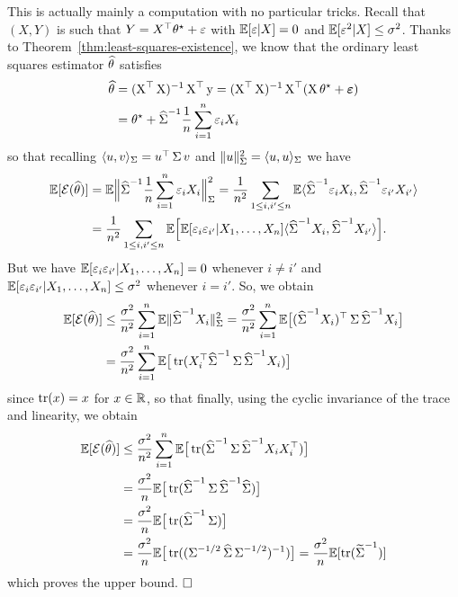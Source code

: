 This is actually mainly a computation with no particular tricks. 
Recall that $(X, Y)$ is such that $Y = X^\top \theta^\star + \eps$ with $\E[\eps | X] = 0$ and $\E[\eps^2 | X] \leq \sigma^2$.
Thanks to Theorem~\ref{thm:least-squares-existence}, we know that the ordinary least squares estimator $\wh \theta$ satisfies
\begin{align*}
	\wh \theta &= (\bX^\top \bX)^{-1} \bX^\top \by = (\bX^\top \bX)^{-1} \bX^\top (\bX \theta^\star + \beps) \\
		&= \theta^\star + \wh \bSigma^{-1} \frac{1}{n} \sum_{i=1}^n \eps_i X_i
\end{align*}
so that recalling $\inr{u, v}_{\bSigma} =u^\top \bSigma v$ and $\norm{u}_{\bSigma}^2 = \inr{u, u}_{\bSigma}$ we have
\begin{align*}
	\E [\cE(\wh \theta)] &= \E \Big\| \wh \bSigma^{-1} \frac{1}{n} \sum_{i=1}^n \eps_i X_i \Big \|_{\bSigma}^2
	 = \frac{1}{n^2} \sum_{1 \leq i, i' \leq n} \E \langle \wh \bSigma^{-1} \eps_i X_i, \wh \bSigma^{-1} \eps_{i'} X_{i'} \rangle \\
	 &= \frac{1}{n^2} \sum_{1 \leq i, i' \leq n} \E \Big[ \E [ \eps_i \eps_{i'} | X_1, \ldots, X_n] \langle \wh \bSigma^{-1}  X_i, \wh \bSigma^{-1} X_{i'} \rangle \Big].
\end{align*}
But we have $\E [ \eps_i \eps_{i'} | X_1, \ldots, X_n] = 0$ whenever $i \neq i'$ and $\E [ \eps_i \eps_{i'} | X_1, \ldots, X_n] \leq \sigma^2$ whenever $i=i'$. So, we obtain
\begin{align*}
	\E [\cE(\wh \theta)] &\leq \frac{\sigma^2}{n^2} \sum_{i=1}^n \E \norm{\wh \bSigma^{-1} X_i}_{\bSigma}^2 
	= \frac{\sigma^2}{n^2} \sum_{i=1}^n \E \big[ (\wh \bSigma^{-1} X_i)^\top \bSigma \wh \bSigma^{-1} X_i \big] \\
	&= \frac{\sigma^2}{n^2} \sum_{i=1}^n \E \big[ \tr (X_i^\top \wh \bSigma^{-1} \bSigma \wh \bSigma^{-1} X_i) \big]
\end{align*}
since $\tr(x) = x$ for $x \in \R$, so that finally, using the cyclic invariance of the trace and linearity, we obtain
\begin{align*}
	\E [\cE(\wh \theta)] &\leq \frac{\sigma^2}{n^2} \sum_{i=1}^n \E \big[ \tr (\wh \bSigma^{-1} \bSigma \wh \bSigma^{-1} X_i X_i^\top )\big] \\
	&= \frac{\sigma^2}{n} \E \big[ \tr (\wh \bSigma^{-1} \bSigma \wh \bSigma^{-1} \wh \bSigma)\big] \\
	&=\frac{\sigma^2}{n} \E \big[ \tr (\wh \bSigma^{-1} \bSigma)\big] \\
	&=\frac{\sigma^2}{n} \E \big[ \tr ( (\bSigma^{-1/2} \wh \bSigma \bSigma^{-1/2})^{-1}) \big] = \frac{\sigma^2}{n} \E[ \tr (\wt \bSigma^{-1}) ]
\end{align*}
which proves the upper bound. $\hfill \square$


